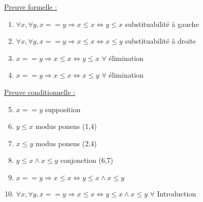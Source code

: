 {\underline{Preuve formelle :}
\begin{enumerate}
\item $ \forall x, \forall y, x==y \Rightarrow x \leq x \Leftrightarrow y \leq x$ \hfill substituabilité à gauche
\item $ \forall x, \forall y, x==y \Rightarrow x \leq x \Leftrightarrow x \leq y$ \hfill substituabilité à droite
\item $ x==y \Rightarrow x \leq x \Leftrightarrow y \leq x $ \hfill $\forall$ élimination
\item $ x==y \Rightarrow x \leq x \Leftrightarrow x \leq y $ \hfill $\forall$ élimination
\end{enumerate}

\underline{Preuve conditionnelle :}
\begin{enumerate}
\setcounter{enumi}{4}
\item $ x==y$ \hfill supposition
\item $ y\leq x$ \hfill modus ponens (1,4)
\item $ x\leq y$ \hfill modus ponens (2,4)
\item $ y\leq x \land  x\leq y$ \hfill conjonction (6,7)
\item $ x==y \Rightarrow x \leq x \Leftrightarrow y\leq x \land  x\leq y$
\item $ \forall x, \forall y, x==y \Rightarrow x \leq x \Leftrightarrow y\leq x \land  x\leq y$ \hfill $\forall$ Introduction
\end{enumerate}
}
